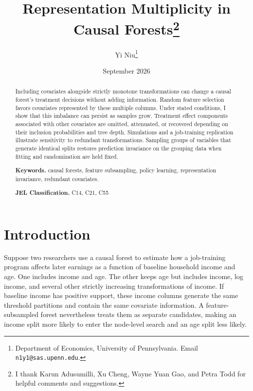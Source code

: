 \documentclass[12pt]{article}
\begin{document}
\title{Representation Multiplicity in Causal Forests\thanks{I thank Karun Adusumilli, Xu Cheng, Wayne Yuan Gao, and Petra Todd for helpful comments and suggestions.}}
\author{Yi Niu\thanks{Department of Economics, University of Pennsylvania. Email \texttt{n1y1@sas.upenn.edu}.}}
\date{September 2026}
\maketitle

\begin{abstract}
\noindent Including covariates alongside strictly monotone transformations can change a causal forest's treatment decisions without adding information. Random feature selection favors covariates represented by these multiple columns. Under stated conditions, I show that this imbalance can persist as samples grow. Treatment effect components associated with other covariates are omitted, attenuated, or recovered depending on their inclusion probabilities and tree depth. Simulations and a job-training replication illustrate sensitivity to redundant transformations. Sampling groups of variables that generate identical splits restores prediction invariance on the grouping data when fitting and randomization are held fixed.
\medskip

\noindent\textbf{Keywords.} causal forests, feature subsampling, policy learning, representation invariance, redundant covariates.

\medskip
\noindent\textbf{JEL Classification.} C14, C21, C55
\end{abstract}

\newpage

\section{Introduction}\label{sec:intro}

Suppose two researchers use a causal forest to estimate how a job-training program affects later earnings as a function of baseline household income and age. One includes income and age. The other keeps age but includes income, log income, and several other strictly increasing transformations of income. If baseline income has positive support, these income columns generate the same threshold partitions and contain the same covariate information. A feature-subsampled forest nevertheless treats them as separate candidates, making an income split more likely to enter the node-level search and an age split less likely.
\end{document}
